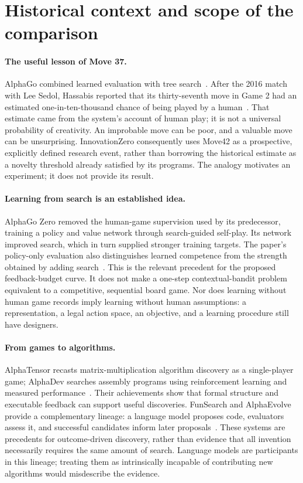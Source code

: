 \section{Historical context and scope of the comparison}
\label{sup:context}

\paragraph{The useful lesson of Move 37.}
AlphaGo combined learned evaluation with tree search~\cite{silver2016alphago}.
After the 2016 match with Lee Sedol, Hassabis reported that its thirty-seventh
move in Game 2 had an estimated one-in-ten-thousand chance of being played by
a human~\cite{hassabis2016seoul}. That estimate came from the system's account of human
play; it is not a universal probability of creativity. An improbable move can
be poor, and a valuable move can be unsurprising. InnovationZero consequently
uses Move42 as a prospective, explicitly defined research event, rather than
borrowing the historical estimate as a novelty threshold already satisfied by
its programs. The analogy motivates an experiment; it does not provide its
result.

\paragraph{Learning from search is an established idea.}
AlphaGo Zero removed the human-game supervision used by its predecessor,
training a policy and value network through search-guided self-play. Its
network improved search, which in turn supplied stronger training targets.
The paper's policy-only evaluation also distinguishes learned competence from
the strength obtained by adding search~\cite{silver2017zero}. This is the relevant
precedent for the proposed feedback-budget curve. It does not make a
one-step contextual-bandit problem equivalent to a competitive, sequential
board game. Nor does learning without human game records imply learning
without human assumptions: a representation, a legal action space, an
objective, and a learning procedure still have designers.

\paragraph{From games to algorithms.}
AlphaTensor recasts matrix-multiplication algorithm discovery as a single-player
game; AlphaDev searches assembly programs using reinforcement learning and
measured performance~\cite{fawzi2022alphatensor,mankowitz2023alphadev}. Their achievements show that
formal structure and executable feedback can support useful discoveries.
FunSearch and AlphaEvolve provide a complementary lineage: a language model
proposes code, evaluators assess it, and successful candidates inform later
proposals~\cite{romeraparedes2024funsearch,novikov2025alphaevolve}. These systems are precedents for
outcome-driven discovery, rather than evidence that all invention necessarily
requires the same amount of search. Language models are participants in this
lineage; treating them as intrinsically incapable of contributing new
algorithms would misdescribe the evidence.


